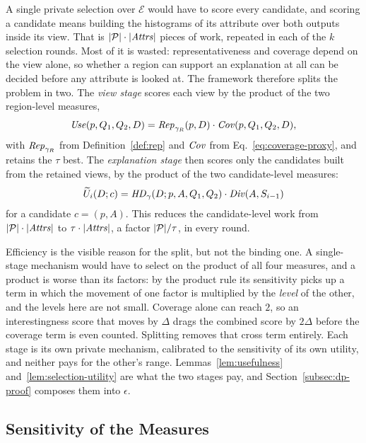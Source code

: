 A single private selection over $\mathcal{E}$ would have to score every candidate, and scoring a candidate means building the histograms of its attribute over both outputs inside its view.
That is $|\mathcal{P}|\cdot|\mathit{Attrs}|$ pieces of work, repeated in each of the $k$ selection rounds.
Most of it is wasted: representativeness and coverage depend on the view alone, so whether a region can support an explanation at all can be decided before any attribute is looked at.
The framework therefore splits the problem in two.
The \emph{view stage} scores each view by the product of the two region-level measures,
\begin{equation}
\mathit{Use}(p,Q_1,Q_2,D)= \mathit{Rep}_{\gamma_R}(p,D)\cdot \mathit{Cov}(p,Q_1,Q_2,D),
\label{eq:usefulness-proxy}
\end{equation}
with $\mathit{Rep}_{\gamma_R}$ from Definition~\ref{def:rep} and $\mathit{Cov}$ from Eq.~\eqref{eq:coverage-proxy}, and retains the $\tau$ best.
The \emph{explanation stage} then scores only the candidates built from the retained views, by the product of the two candidate-level measures:
\begin{equation}
\widetilde{U}_i(D;c)=\mathit{HD}_{\gamma}(D;p,A,Q_1,Q_2)\cdot \mathit{Div}(A,S_{i-1})
\label{eq:selection-utility}
\end{equation}
for a candidate $c=(p,A)$.
This reduces the candidate-level work from $|\mathcal{P}|\cdot|\mathit{Attrs}|$ to $\tau\cdot|\mathit{Attrs}|$, a factor $|\mathcal{P}|/\tau$, in every round.

Efficiency is the visible reason for the split, but not the binding one.
A single-stage mechanism would have to select on the product of all four measures, and a product is worse than its factors: by the product rule its sensitivity picks up a term in which the movement of one factor is multiplied by the \emph{level} of the other, and the levels here are not small.
Coverage alone can reach $2$, so an interestingness score that moves by $\Delta$ drags the combined score by $2\Delta$ before the coverage term is even counted.
Splitting removes that cross term entirely.
Each stage is its own private mechanism, calibrated to the sensitivity of its own utility, and neither pays for the other's range.
Lemmas~\ref{lem:usefulness} and~\ref{lem:selection-utility} are what the two stages pay, and Section~\ref{subsec:dp-proof} composes them into $\epsilon$.
\subsection{Sensitivity of the Measures}
\label{subsec:ideal-sensitivity}

